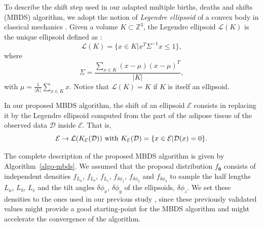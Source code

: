 \documentclass[journal]{IEEEtran}
\begin{document}
To describe the shift step used in our adapted multiple births, deaths
and shifts (MBDS) algorithm, we adopt the notion of \textit{Legendre
  ellipsoid} of a convex body in classical mechanics
\cite{lutwak2000new}. Given a volume $K \subset \mathbb{Z}^3$, the
Legendre ellipsoid $\mathcal{L}(K)$ is the unique ellipsoid defined as
\cite{ludwig2003ellipsoids}:
\begin{equation}
  \label{eq:legendre-ellip-orig}
  \mathcal{L}(K) = \{ x \in K | x^T \Sigma^{-1} x \leq 1 \},
\end{equation}
where
\begin{equation}
  \label{eq:legendre-ellip-cov}
  \Sigma = \frac{\sum_{x \in K} (x - \mu)(x - \mu)^T} {|K|},
\end{equation}
with $\mu = \frac{1}{|K|} \sum_{x \in K} x$. Notice that
$\mathcal{L}(K) = K$ if $K$ is itself an ellipsoid.

In our proposed MBDS algorithm, the shift of an ellipsoid
$\mathcal{E}$ consists in replacing it by the Legendre ellipsoid
computed from the part of the adipose tissue of the observed data
$\mathcal{D}$ inside $\mathcal{E}$. That is,
\begin{equation}
  \label{eq:legendre-ellip}
  \mathcal{E} \rightarrow \mathcal{L}(K_{\mathcal{E}}(\mathcal{D}))
  \textnormal{ with } K_{\mathcal{E}}(\mathcal{D}) = \{x \in
  \mathcal{E} | \mathcal{D}(x) = 0 \}.
\end{equation}

The complete description of the proposed MBDS algorithm is given by
Algorithm~\ref{algo-mbds}. We assumed that the proposal distribution
$f_{\boldsymbol{\theta}}$ consists of independent densities $f_{L_a}$,
$f_{L_b}$, $f_{L_c}$, $f_{\delta{\phi_1}}$, $f_{\delta{\phi_2}}$ and
$f_{\delta{\phi_3}}$ to sample the half lengths $L_a$, $L_b$, $L_c$
and the tilt angles $\delta{\phi_x}$, $\delta{\phi_y}$ of the
ellipsoids, $\delta{\phi_z}$. We set these densities to the ones used
in our previous study \cite{li2016novel}, since these previously
validated values might provide a good starting-point for the MBDS
algorithm and might accelerate the convergence of the algorithm.
\end{document}
